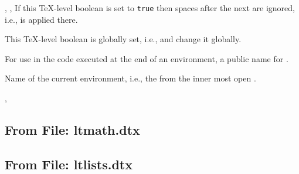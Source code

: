 \documentclass{l3in2edoc}
\begin{document}
\begin{function}[]
  {
    \if@ignore,
    \@ignorefalse,
    \@ignoretrue
  }
  If this \TeX{}-level boolean is set to \texttt{true} then spaces
  after the next  are ignored, i.e.,  is
  applied there.
  
  This \TeX{}-level boolean is globally set, i.e., 
  and  change it globally.
\end{function}


\begin{function}[user]
  {
    \ignorespacesafterend
  }
  \begin{syntax}
  \end{syntax}
  For use in the code executed at the end of an environment, a public
  name for .
\end{function}




\begin{variable}[]
  {
    \@currenvir
  }
%
  Name of the current environment, i.e., the  from the
  inner most open .
\end{variable}



\begin{function}[user]
  {
    \document,
    \enddocument
  }
  \begin{syntax}
       
  \end{syntax}

\end{function}




\subsection{From File: ltmath.dtx}

\begin{function}[]
  {
    \medspace
  }

\end{function}





\subsection{From File: ltlists.dtx}
\end{document}
